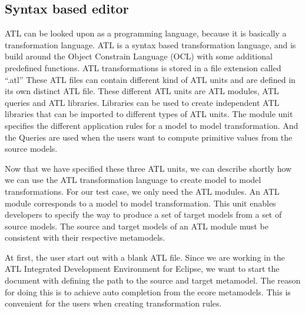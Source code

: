 \subsection{Syntax based editor}

\noindent ATL can be looked upon as a programming language, because it is
basically a transformation language. ATL is a syntax based transformation
language, and is build around the Object Constrain Language (OCL) \cite{OCL}
with some additional predefined functions. ATL transformations is stored in a
file extension called ``.atl'' These ATL files can contain different kind of
ATL units and are defined in its own distinct ATL file. These different ATL
units are ATL modules, ATL queries and ATL libraries. Libraries can be used to
create independent ATL libraries that can be imported to different types of ATL
units. The module unit specifies the different application rules for a model to
model transformation. And the Queries are used when the users want to compute
primitive values from the source models.

Now that we have specified these three ATL units, we can describe shortly how
we can use the ATL transformation language to create model to model
transformations. For our test case, we only need the ATL modules. An ATL module
corresponds to a model to model transformation. This unit enables developers to
specify the way to produce a set of target models from a set of source models.
The source and target models of an ATL module must be consistent with their
respective metamodels. 

At first, the user start out with a blank ATL file. Since we are working in
the ATL Integrated Development Environment for Eclipse, we want to start the
document with defining the path to the source and target metamodel. The
reason for doing this is to achieve auto completion from the ecore metamodels.
This is convenient for the users when creating transformation rules. 

